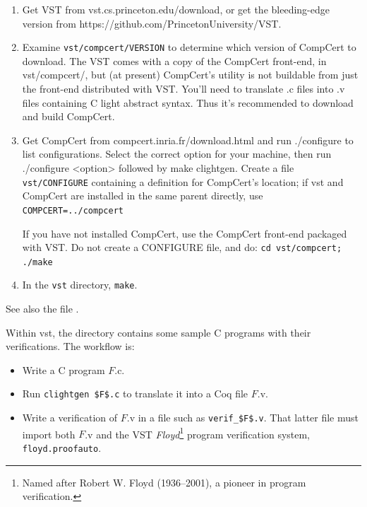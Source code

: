 \documentclass[12pt,fleqn,openany,oneside,showtrims]{memoir}
\begin{document}
\begin{enumerate}\setlength\itemsep{0pt}
\item  Get VST from \textsf{vst.cs.princeton.edu/download},
or get the bleeding-edge version from
\textsf{https://github.com/PrincetonUniversity/VST}.
\item Examine \lstinline{vst/compcert/VERSION} to determine which
version of CompCert to download.
The VST comes with a copy of the CompCert front-end, in vst/compcert/,
but (at present) CompCert's  utility is not buildable
from just the front-end distributed with VST.  You'll need 
to translate .c files into .v files containing C light abstract syntax.
Thus it's recommended to download
and build CompCert.

\item Get CompCert from \textsf{compcert.inria.fr/download.html}
and run \textsf{./configure} to list configurations. Select the correct option
for your machine, then run \textsf{./configure <option>} followed by \newline
\textsf{make clightgen}.
Create a file \lstinline{vst/CONFIGURE} containing a definition for CompCert's location;
if vst and CompCert are installed in the same
parent directly, use \lstinline{COMPCERT=../compcert}

If you have  not installed CompCert,
use the CompCert front-end packaged with VST.
Do not create a CONFIGURE file, and do:\newline
\lstinline{cd vst/compcert; ./make}

\item In the \lstinline{vst} directory, \lstinline{make}.
\end{enumerate}
See also the file .

Within vst, the  directory contains some sample C programs
with their verifications.  The workflow is:
\begin{itemize}
\item Write a C program $F$.c.
\item Run \lstinline{clightgen $F$.c} to translate it into a Coq
file $F$.v.
\item Write a verification of $F$.v in a file such as
\lstinline{verif_$F$.v}.  That latter file must import
both $F$.v and the VST \emph{Floyd}\footnote{Named after Robert W. Floyd (1936--2001), a pioneer in program verification.} program verification system,
\lstinline{floyd.proofauto}.
\end{itemize}
\end{document}
